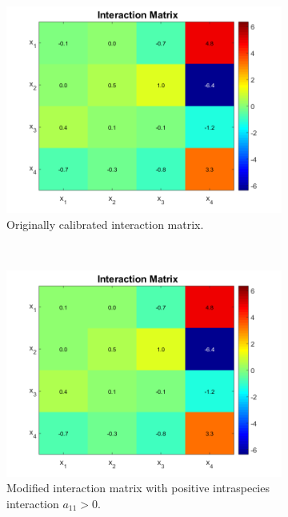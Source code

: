 \documentclass[processes,article,submit,moreauthors,pdftex]{Definitions/mdpi}
\begin{document}
\begin{figure}[h]
	\begin{subfigure}[t]{0.32\textwidth}
		\includegraphics[width=\textwidth]{Stability/Interactions_parameters_Dumont}
		\caption{Originally calibrated interaction matrix.}
		\label{Interaction_1}
	\end{subfigure}
	~
	\begin{subfigure}[t]{0.32\textwidth}
		\includegraphics[width=\textwidth]{Stability/Interactions_parameters_modified}
		\caption{Modified interaction matrix with positive intraspecies interaction $a_{11}>0$.}
		\label{Interaction_2}
	\end{subfigure}
	~
	\begin{subfigure}[t]{0.32\textwidth}

\end{subfigure}
\end{figure}
\end{document}
